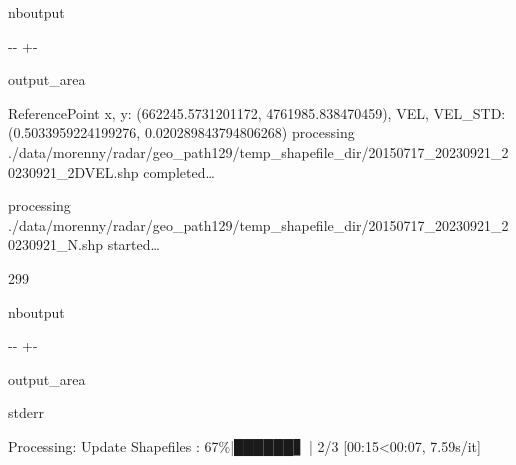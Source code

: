 \documentclass[letterpaper,10pt,english]{sphinxmanual}
\begin{document}
\begin{sphinxuseclass}{nboutput}
{

\kern-\sphinxverbatimsmallskipamount\kern-\baselineskip
\kern+\FrameHeightAdjust\kern-\fboxrule
\vspace{\nbsphinxcodecellspacing}

\begin{sphinxuseclass}{output_area}
\begin{sphinxuseclass}{}


\begin{sphinxVerbatim}[commandchars=\\\{\}]
ReferencePoint x, y: (662245.5731201172, 4761985.838470459), VEL, VEL\_STD: (0.5033959224199276, 0.020289843794806268)
processing ./data/morenny/radar/geo\_path129/temp\_shapefile\_dir/20150717\_20230921\_20230921\_2DVEL.shp completed{\ldots}

processing ./data/morenny/radar/geo\_path129/temp\_shapefile\_dir/20150717\_20230921\_20230921\_N.shp started{\ldots}

299
\end{sphinxVerbatim}



\end{sphinxuseclass}
\end{sphinxuseclass}
}

\end{sphinxuseclass}
\begin{sphinxuseclass}{nboutput}
{

\kern-\sphinxverbatimsmallskipamount\kern-\baselineskip
\kern+\FrameHeightAdjust\kern-\fboxrule
\vspace{\nbsphinxcodecellspacing}

\begin{sphinxuseclass}{output_area}
\begin{sphinxuseclass}{stderr}


\begin{sphinxVerbatim}[commandchars=\\\{\}]
Processing: Update Shapefiles :  67\%|██████▋   | 2/3 [00:15<00:07,  7.59s/it]
\end{sphinxVerbatim}



\end{sphinxuseclass}
\end{sphinxuseclass}
}

\end{sphinxuseclass}
\end{document}
